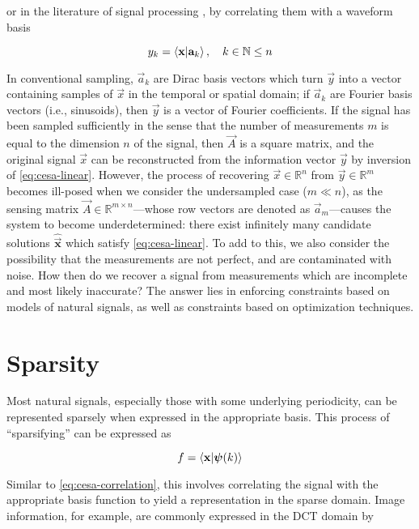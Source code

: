 \noindent or in the literature of signal processing \cite{Candes2008b}, by correlating them with a waveform basis

\begin{equation}\label{eq:cesa-correlation}
	y_k = \innerproduct{\vec{x}}{\vec{a}_k} , \quad k \in \mathbb{N} \leq n
\end{equation}

In conventional sampling, $\vec{a}_k$ are Dirac basis vectors which turn $\vec{y}$ into a vector containing samples of $\vec{x}$ in the temporal or spatial domain; if $\vec{a}_k$ are Fourier basis vectors (i.e., sinusoids), then $\vec{y}$ is a vector of Fourier coefficients. If the signal has been sampled sufficiently in the sense that the number of measurements $m$ is equal to the dimension $n$ of the signal, then $\vec{A}$ is a square matrix, and the original signal $\vec{x}$ can be reconstructed from the information vector $\vec{y}$ by inversion of \eqref{eq:cesa-linear}. However, the process of recovering $\vec{x} \in \mathbb{R}^n$ from $\vec{y} \in \mathbb{R}^m$ becomes ill-posed when we consider the undersampled case ($m \ll n$), as the sensing matrix $\vec{A} \in \mathbb{R}^{m \times n}$---whose row vectors are denoted as $\vec{a}_m$---causes the system to become underdetermined: there exist infinitely many candidate solutions $\bm\hat{\vec{x}}$ which satisfy \eqref{eq:cesa-linear}. To add to this, we also consider the possibility that the measurements are not perfect, and are contaminated with noise. How then do we recover a signal from measurements which are incomplete and most likely inaccurate? The answer lies in enforcing constraints based on models of natural signals, as well as constraints based on optimization techniques.

\section{Sparsity}
\label{sec:sparsity}

Most natural signals, especially those with some underlying periodicity, can be represented sparsely when expressed in the appropriate basis. This process of ``sparsifying'' can be expressed as

\begin{equation}\label{eq:sparsify}
	f = \innerproduct{\vec{x}}{\bm\psi(k)}
\end{equation}

Similar to \eqref{eq:cesa-correlation}, this involves correlating the signal with the appropriate basis function to yield a representation in the sparse domain. Image information, for example, are commonly expressed in the DCT domain by

